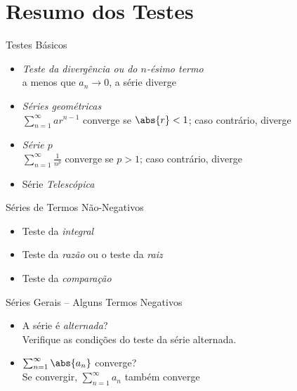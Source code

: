 \section{Resumo dos Testes}

\begin{frame}{Testes Básicos}
	\begin{itemize}[<+->]
		\item \emph{Teste da divergência ou do $n$-ésimo termo}\\
          a menos que $a_n\to 0$, a série diverge \\[5mm]
		\item \emph{Séries geométricas} \\[3mm]
          \(\sum_{n=1}^{\infty} ar^{n-1}\) converge se \(\abs{r}<1\); caso contrário, diverge \\[5mm]
		\item \emph{Série $p$} \\[3mm]
          \(\sum_{n=1}^{\infty} \frac{1}{n^p}\)
          converge se $p>1$; caso contrário, diverge\\[5mm]
    \item Série \emph{Telescópica}
	\end{itemize}
\end{frame}

\begin{frame}{Séries de Termos Não-Negativos}
\begin{itemize}[<+->]
  \item Teste da \emph{integral} \\[5mm]
  \item Teste da \emph{razão} ou o teste da \emph{raiz} \\[5mm]
  \item Teste da \emph{comparação}
\end{itemize}
\end{frame}

\begin{frame}{Séries Gerais -- Alguns Termos Negativos}
	\begin{itemize}[<+->]
    \item A série é \emph{alternada}? \\[3mm]
          Verifique as condições do teste da série alternada. \\[5mm]
		\item \(\sum_{n=1}^{\infty} \abs{a_n}\) converge? \\[3mm]
		      Se convergir, \(\sum_{n=1}^{\infty} a_n\) também converge
	\end{itemize}
\end{frame}

